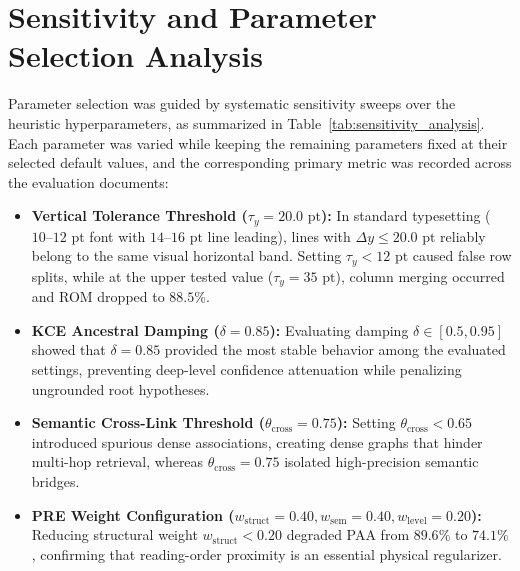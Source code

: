 \documentclass[12pt,a4paper]{report}
\begin{document}
\section{Sensitivity and Parameter Selection Analysis}
Parameter selection was guided by systematic sensitivity sweeps over the heuristic hyperparameters, as summarized in Table~\ref{tab:sensitivity_analysis}. Each parameter was varied while keeping the remaining parameters fixed at their selected default values, and the corresponding primary metric was recorded across the evaluation documents:
\begin{itemize}
    \item \textbf{Vertical Tolerance Threshold ($\tau_y = 20.0\text{ pt}$):} In standard typesetting ($10\text{--}12\text{ pt}$ font with $14\text{--}16\text{ pt}$ line leading), lines with $\Delta y \le 20.0\text{ pt}$ reliably belong to the same visual horizontal band. Setting $\tau_y < 12\text{ pt}$ caused false row splits, while at the upper tested value ($\tau_y = 35\text{ pt}$), column merging occurred and ROM dropped to $88.5\%$.
    \item \textbf{KCE Ancestral Damping ($\delta = 0.85$):} Evaluating damping $\delta \in [0.5, 0.95]$ showed that $\delta = 0.85$ provided the most stable behavior among the evaluated settings, preventing deep-level confidence attenuation while penalizing ungrounded root hypotheses.
    \item \textbf{Semantic Cross-Link Threshold ($\theta_{\text{cross}} = 0.75$):} Setting $\theta_{\text{cross}} < 0.65$ introduced spurious dense associations, creating dense graphs that hinder multi-hop retrieval, whereas $\theta_{\text{cross}} = 0.75$ isolated high-precision semantic bridges.
    \item \textbf{PRE Weight Configuration ($w_{\text{struct}}=0.40, w_{\text{sem}}=0.40, w_{\text{level}}=0.20$):} Reducing structural weight $w_{\text{struct}} < 0.20$ degraded PAA from $89.6\%$ to $74.1\%$, confirming that reading-order proximity is an essential physical regularizer.
\end{itemize}
\end{document}
